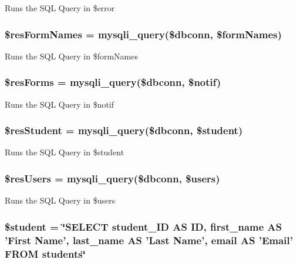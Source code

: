 \-Runs the \-S\-Q\-L \-Query in \$error \hypertarget{settings_8php_a3442ba39121c93784426f695600100ed}{
\subsubsection[{\$res\-Form\-Names}]{\setlength{\rightskip}{0pt plus 5cm}\$res\-Form\-Names = mysqli\-\_\-query(\$dbconn, \$form\-Names)}}\label{settings_8php_a3442ba39121c93784426f695600100ed}
\-Runs the \-S\-Q\-L \-Query in \$form\-Names \hypertarget{settings_8php_ac1efa906f5ef5a29c1f02d9afc08e3df}{
\subsubsection[{\$res\-Forms}]{\setlength{\rightskip}{0pt plus 5cm}\$res\-Forms = mysqli\-\_\-query(\$dbconn, \$notif)}}\label{settings_8php_ac1efa906f5ef5a29c1f02d9afc08e3df}
\-Runs the \-S\-Q\-L \-Query in \$notif \hypertarget{settings_8php_a6c39affecebae5119fae4099069c709b}{
\subsubsection[{\$res\-Student}]{\setlength{\rightskip}{0pt plus 5cm}\$res\-Student = mysqli\-\_\-query(\$dbconn, \$student)}}\label{settings_8php_a6c39affecebae5119fae4099069c709b}
\-Runs the \-S\-Q\-L \-Query in \$student \hypertarget{settings_8php_aee2bc5dc8abe81b77e854b5714fe4182}{
\subsubsection[{\$res\-Users}]{\setlength{\rightskip}{0pt plus 5cm}\$res\-Users = mysqli\-\_\-query(\$dbconn, \$users)}}\label{settings_8php_aee2bc5dc8abe81b77e854b5714fe4182}
\-Runs the \-S\-Q\-L \-Query in \$users \hypertarget{settings_8php_a5a5a2522ab0ea5c503744aa937fac0e2}{
\subsubsection[{\$student}]{\setlength{\rightskip}{0pt plus 5cm}\$student = \char`\"{}\-S\-E\-L\-E\-C\-T student\-\_\-\-I\-D \-A\-S \-I\-D, first\-\_\-name \-A\-S '\-First \-Name', last\-\_\-name \-A\-S '\-Last \-Name', email \-A\-S '\-Email' \-F\-R\-O\-M students\char`\"{}}}\label{settings_8php_a5a5a2522ab0ea5c503744aa937fac0e2}
